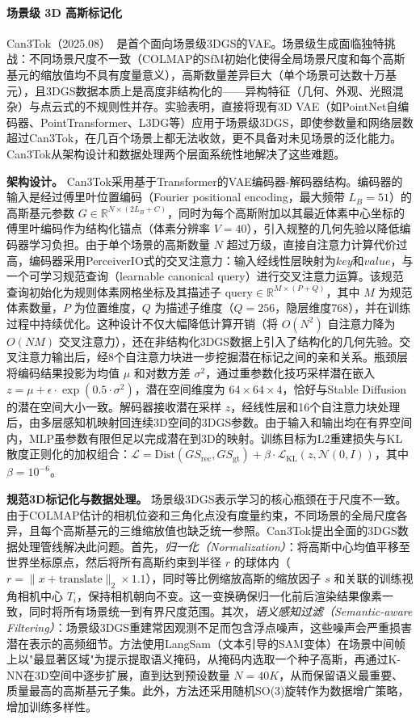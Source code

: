 \paragraph{场景级 3D 高斯标记化}

Can3Tok（2025.08）~\cite{2508_01464}是首个面向场景级3DGS的VAE。场景级生成面临独特挑战：不同场景尺度不一致（COLMAP的SfM初始化使得全局场景尺度和每个高斯基元的缩放值均不具有度量意义），高斯数量差异巨大（单个场景可达数十万基元），且3DGS数据本质上是高度非结构化的——异构特征（几何、外观、光照混杂）与点云式的不规则性并存。实验表明，直接将现有3D VAE（如PointNet自编码器、PointTransformer、L3DG等）应用于场景级3DGS，即使参数量和网络层数超过Can3Tok，在几百个场景上都无法收敛，更不具备对未见场景的泛化能力。Can3Tok从架构设计和数据处理两个层面系统性地解决了这些难题。

\textbf{架构设计。}
Can3Tok采用基于Transformer的VAE编码器-解码器结构。编码器的输入是经过傅里叶位置编码（Fourier positional encoding，最大频带 $L_B=51$）的高斯基元参数 $G \in \mathbb{R}^{N \times (2L_B+C)}$，同时为每个高斯附加以其最近体素中心坐标的傅里叶编码作为结构化锚点（体素分辨率 $V=40$），引入规整的几何先验以降低编码器学习负担。由于单个场景的高斯数量 $N$ 超过万级，直接自注意力计算代价过高，编码器采用PerceiverIO式的交叉注意力：输入经线性层映射为$key$和$value$，与一个可学习规范查询（learnable canonical query）进行交叉注意力运算。该规范查询初始化为规则体素网格坐标及其描述子 $\text{query} \in \mathbb{R}^{M \times (P+Q)}$，其中 $M$ 为规范体素数量，$P$ 为位置维度，$Q$ 为描述子维度（$Q=256$，隐层维度768），并在训练过程中持续优化。这种设计不仅大幅降低计算开销（将 $O(N^2)$ 自注意力降为 $O(NM)$ 交叉注意力），还在非结构化3DGS数据上引入了结构化的几何先验。交叉注意力输出后，经8个自注意力块进一步挖掘潜在标记之间的亲和关系。瓶颈层将编码结果投影为均值 $\mu$ 和对数方差 $\sigma^2$，通过重参数化技巧采样潜在嵌入 $z = \mu + \epsilon \cdot \exp(0.5 \cdot \sigma^2)$，潜在空间维度为 $64 \times 64 \times 4$，恰好与Stable Diffusion的潜在空间大小一致。解码器接收潜在采样 $z$，经线性层和16个自注意力块处理后，由多层感知机映射回连续3D空间的3DGS参数。由于输入和输出均在有界空间内，MLP虽参数有限但足以完成潜在到3D的映射。训练目标为L2重建损失与KL散度正则化的加权组合：$\mathcal{L} = \text{Dist}(GS_\text{rec}, GS_\text{gt}) + \beta \cdot \mathcal{L}_\text{KL}(z, \mathcal{N}(0, I))$，其中 $\beta = 10^{-6}$。

\textbf{规范3D标记化与数据处理。}
场景级3DGS表示学习的核心瓶颈在于尺度不一致。由于COLMAP估计的相机位姿和三角化点没有度量约束，不同场景的全局尺度各异，且每个高斯基元的三维缩放值也缺乏统一参照。Can3Tok提出全面的3DGS数据处理管线解决此问题。首先，\emph{归一化（Normalization）}：将高斯中心均值平移至世界坐标原点，然后将所有高斯约束到半径 $r$ 的球体内（$r = \|x + \text{translate}\|_2 \times 1.1$），同时等比例缩放高斯的缩放因子 $s$ 和关联的训练视角相机中心 $T_i$，保持相机朝向不变。这一变换确保归一化前后渲染结果像素一致，同时将所有场景统一到有界尺度范围。其次，\emph{语义感知过滤（Semantic-aware Filtering）}：场景级3DGS重建常因观测不足而包含浮点噪声，这些噪声会严重损害潜在表示的高频细节。方法使用LangSam（文本引导的SAM变体）在场景中间帧上以"最显著区域"为提示提取语义掩码，从掩码内选取一个种子高斯，再通过K-NN在3D空间中逐步扩展，直到达到预设数量 $N=40K$，从而保留语义最重要、质量最高的高斯基元子集。此外，方法还采用随机SO(3)旋转作为数据增广策略，增加训练多样性。

